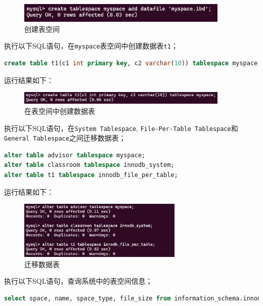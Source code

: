 \documentclass{article}
\renewcommand\tt{\texttt}
\begin{document}
\begin{figure}[H]
\centering
\includegraphics[width=0.9\textwidth]{img/1.png}
\caption{创建表空间}
\end{figure}

执行以下SQL语句，在\tt{myspace}表空间中创建数据表\tt{t1}；

\begin{lstlisting}[language=sql]
create table t1(c1 int primary key, c2 varchar(10)) tablespace myspace;
\end{lstlisting}

运行结果如下：

\begin{figure}[H]
\centering
\includegraphics[width=0.9\textwidth]{img/2.png}
\caption{在表空间中创建数据表}
\end{figure}

执行以下SQL语句，在\tt{System Tablespace}, \tt{File-Per-Table Tablespace}和\tt{General Tablespace}之间迁移数据表；

\begin{lstlisting}[language=sql]
alter table advisor tablespace myspace;
alter table classroom tablespace innodb_system;
alter table t1 tablespace innodb_file_per_table;
\end{lstlisting}

运行结果如下：

\begin{figure}[H]
\centering
\includegraphics[width=0.7\textwidth]{img/3.png}
\caption{迁移数据表}
\end{figure}

执行以下SQL语句，查询系统中的表空间信息；

\begin{lstlisting}[language=sql]
select space, name, space_type, file_size from information_schema.innodb_tablespaces;
\end{lstlisting}
\end{document}
